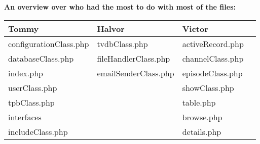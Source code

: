 \textbf{An overview over who had the most to do with most of the files:}\\

\begin{tabular}{| l | l | l | l |}
\hline
Tommy 				& Halvor 			& Victor\\ \hline
configurationClass.php		& tvdbClass.php		& activeRecord.php \\
databaseClass.php 			& fileHandlerClass.php 	& channelClass.php \\
index.php				&emailSenderClass.php 	& episodeClass.php\\
userClass.php 			&				& showClass.php\\
tpbClass.php                                &				& table.php\\
interfaces 			          &				& browse.php\\
includeClass.php 		          &				& details.php\\			
\hline
\end{tabular}